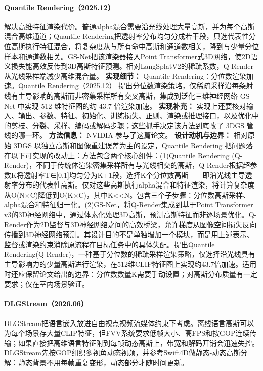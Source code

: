 \paragraph{Quantile Rendering（2025.12）\cite{2512_20927}}
解决高维特征渲染代价。普通alpha混合需要沿光线处理大量高斯，并为每个高斯混合高维通道；Quantile Rendering把透射率分布均匀分成若干段，只选代表性分位高斯执行特征混合，将复杂度从与所有命中高斯和通道数相关，降到与少量分位样本和通道数相关。GS-Net把该渲染器接入Point Transformer式3D网络，使2D语义损失能高效反传到3D高斯特征预测。相对LangSplatV2的稀疏系数，Q-Render从光线采样端减少高维混合量。
\textbf{实现细节：} Quantile Rendering：分位数渲染加速。Quantile Rendering（2025.12） 提出分位数渲染策略，仅稀疏采样沿每条射线有主导影响的高斯而非密集采样所有交叉高斯，集成到泛化三维神经网络 GS-Net 中实现 512 维特征图的约 43.7 倍渲染加速。
\textbf{实现补充：} 实现上还要核对输入、输出、参数、特征、初始化、训练损失、正则、渲染或推理接口，以及优化中的剪枝、分裂、采样、编码或解码步骤；这些抓手决定该方法到底改了 3DGS 管线的哪一环。
\textbf{方法信息：} NVIDIA 参与了这篇论文。
\textbf{设计动机与边界：} 相对原始 3DGS 以独立高斯和图像重建误差为主的设定，Quantile Rendering 把问题落在以下可实现的改动上：方法包含两个核心组件：(1)Quantile Rendering (Q-Render)，不同于传统体渲染密集采样所有与光线相交的高斯，Q-Render根据超参数K将透射率T∈[0,1]均匀分为K+1段，选择K个分位数高斯——即沿光线主导透射率分布的代表性高斯。仅对这些高斯执行alpha混合和特征渲染，将计算复杂度从O(N×C)降低到O(K×C)，其中K<<N。包含三个子步骤：分位数高斯采样、alpha混合和特征归一化。(2)GS-Net，将Q-Render集成到基于Point Transformer v3的3D神经网络中，通过体素化处理3D高斯，预测高斯特征而非逐场景优化。Q-Render作为2D监督与3D神经网络之间的高效桥梁，允许梯度从图像空间损失反向传播到3D神经网络预测。其设计目的不是单独增加一个模块，而是用上述表示、监督或渲染约束消除原流程在目标任务中的具体失配。提出Quantile Rendering(Q-Render)，一种基于分位数的稀疏采样渲染策略，仅选择沿光线具有主导影响力的少量高斯进行渲染，在512维CLIP特征图上实现约43.7倍加速。适用时还应保留论文给出的边界：分位数数量K需要手动设置；对高斯分布质量有一定要求；仅在室内场景验证。
\paragraph{DLGStream（2026.06）\cite{2606_28840}}
DLGStream把语言嵌入放进自由视点视频流媒体约束下考虑。离线语言高斯可以为每个场景存大量CLIP特征，但FVV系统要求低帧大小、高FPS和按GOP连续传输；如果直接把高维语言特征附到每帧动态高斯上，带宽和解码开销会迅速失控。DLGStream先按GOP组织多视角动态视频，并参考Swift4D做静态-动态高斯分解：静态背景不用每帧重复变形，动态部分才随时间更新。


